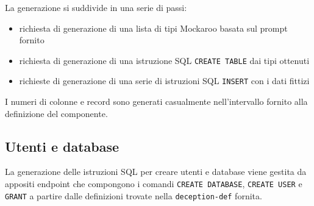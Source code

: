 La generazione si suddivide in una serie di passi:
\begin{itemize}
    \item richiesta di generazione di una lista di tipi Mockaroo basata sul prompt fornito
    \item richiesta di generazione di una istruzione SQL \texttt{CREATE TABLE} dai tipi ottenuti
    \item richieste di generazione di una serie di istruzioni SQL \texttt{INSERT} con i dati fittizi
\end{itemize}

I numeri di colonne e record sono generati casualmente nell'intervallo fornito alla definizione del componente.

\subsection{Utenti e database}
La generazione delle istruzioni SQL per creare utenti e database viene gestita da appositi endpoint che compongono i comandi \texttt{CREATE DATABASE}, \texttt{CREATE USER} e \texttt{GRANT} a partire dalle definizioni trovate nella \texttt{deception-def} fornita.

